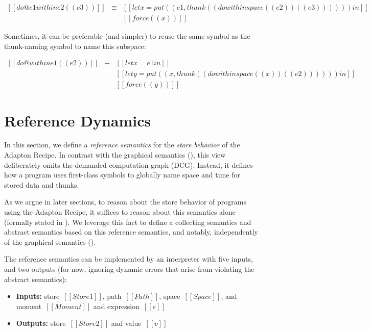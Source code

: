 \documentclass[11pt]{article}
\begin{document}
\[
\begin{array}{lcl}
  [[do @e1 within e2 ({( e3 )})]]
  &\equiv&
  [[let x = put((e1, thunk((do within space ((e2))({(e3)}) )))) in]]
  \\
  &&[[force((x))]]
\end{array}
\]

\noindent
Sometimes, it can be preferable (and simpler) to reuse the same symbol
as the thunk-naming symbol to name this subspace:

\[
\begin{array}{lcl}
  [[do @within e1 ({( e2 )})]]
  &\equiv&
  [[let x = e1 in]]
  \\
  &&[[let y = put((x, thunk((do within space ((x))({(e2)}))))) in]]
  \\
  &&[[force((y))]]
\end{array}
\]

\section{Reference Dynamics}
\label{sec:reference-dynamics}

In this section, we define a \emph{reference semantics} for the \emph{store behavior} of the Adapton Recipe.
%
In contrast with the graphical semantics (),
this view deliberately omits the demanded computation graph (DCG).
%
Instead, it defines how a program uses first-class symbols to
globally name space and time for stored data and thunks.

As we argue in later sections,
to reason about the store behavior of programs using the Adapton Recipe,
it suffices to reason about this semantics alone (formally stated in ).
%
We leverage this fact to define a collecting semantics and abstract semantics 
based on this reference semantics, and notably,
independently 
of the graphical semantics ().

The reference semantics can be implemented by an interpreter with five inputs, and two outputs
(for now, ignoring dynamic errors that arise from violating the abstract semantics):

\begin{itemize}
\item \textbf{Inputs:}
  store~$[[Store1]]$,
  path~$[[Path]]$,
  space~$[[Space]]$,
  and
  moment~$[[Moment]]$
  and expression~$[[e]]$
\item \textbf{Outputs:}
  store~$[[Store2]]$ and value~$[[v]]$
\end{itemize}
\end{document}
